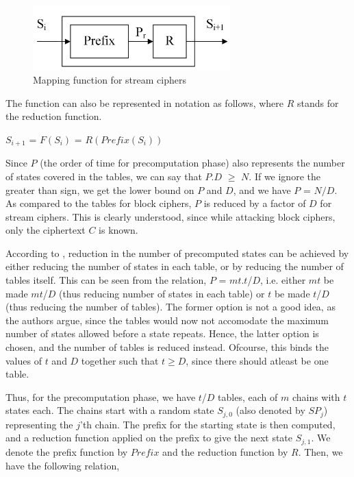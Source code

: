 \begin{figure}[ht!]
	\centering
		\includegraphics[width=3in]{./figures/mapping-function-stream.PNG}
	\caption{Mapping function for stream ciphers}	
	\label{fig:mapping-function-stream}
\end{figure}

The function can also be represented in notation as follows, where $R$ stands for the reduction function.

\begin{center}
$S_{i+1}$ = $F(S_i)$ = $R(Prefix(S_i))$\\
\end{center}

Since $P$ (the order of time for precomputation phase) also represents the number of states covered in the tables, we can say that $P$.$D$ $\geq$ $N$. If we ignore the greater than sign, we get the lower bound on $P$ and $D$, and we have $P$ = $N/D$. As compared to the tables for block ciphers, $P$ is reduced by a factor of $D$ for stream ciphers. This is clearly understood, since while attacking block ciphers, only the ciphertext $C$ is known. 

According to \cite{biryukov2000ctm}, reduction in the number of precomputed states can be achieved by either reducing the number of states in each table, or by reducing the number of tables itself. This can be seen from the relation, $P$ = $mt$.$t$/$D$, i.e. either $mt$ be made $mt$/$D$ (thus reducing number of states in each table) or $t$ be made $t$/$D$ (thus reducing the number of tables). The former option is not a good idea, as the authors argue, since the tables would now not accomodate the maximum number of states allowed before a state repeats. Hence, the latter option is chosen, and the number of tables is reduced instead. Ofcourse, this binds the values of $t$ and $D$ together such that $t \geq D$, since there should atleast be one table. 

Thus, for the precomputation phase, we have $t$/$D$ tables, each of $m$ chains with $t$ states each. The chains start with a random state $S_{j,0}$ (also denoted by $SP_j$) representing the $j$'th chain. The prefix for the starting state is then computed, and a reduction function applied on the prefix to give the next state $S_{j,1}$. We denote the prefix function by $Prefix$ and the reduction function by $R$. Then, we have the following relation,

